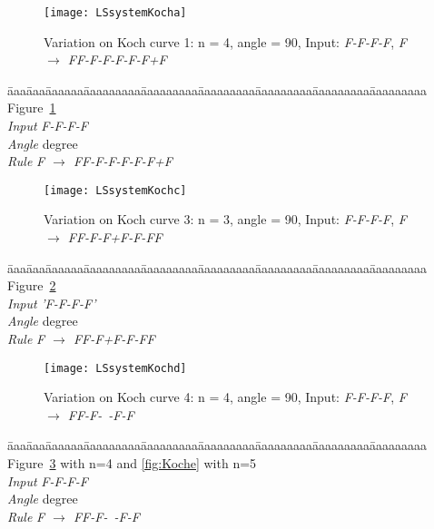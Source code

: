 \begin{figure}[!h]
\centerline{\texttt{[image: LSsystemKocha]}}
\caption{Variation on Koch curve 1: n = 4, angle = 90, Input: \emph{F-F-F-F}, \emph{F $\rightarrow$ FF-F-F-F-F-F+F}}
\label{fig:Kocha}
\end{figure}


\begin{tabbing}
\=aaa\=aaa\=aaaaaa\=aaaaaaaaa\=aaaaaaaaa\=aaaaaaaaa\=aaaaaaaaa\=aaaaaaaaa\=aaaaaaaaa\kill
Figure~\ref{fig:Kocha} \\
\>\> \emph{Input} \>\>\emph{F-F-F-F}\\
\>\> \emph{Angle} \> degree\\
\>\> \emph{Rule}  \>\>\emph{F $\rightarrow$ FF-F-F-F-F-F+F}
\end{tabbing}






\begin{figure}[!htbp]
\centerline{\texttt{[image: LSsystemKochc]}}
\caption{Variation on Koch curve 3: n = 3, angle = 90, Input: \emph{F-F-F-F}, \emph{F $\rightarrow$ FF-F-F+F-F-FF}}
\label{fig:Kochc}
\end{figure}

\begin{tabbing}
\=aaa\=aaa\=aaaaaa\=aaaaaaaaa\=aaaaaaaaa\=aaaaaaaaa\=aaaaaaaaa\=aaaaaaaaa\=aaaaaaaaa\kill
Figure~\ref{fig:Kochc} \\
\>\> \emph{Input} \>\>\emph{'F-F-F-F'}\\
\>\> \emph{Angle} \> degree\\
\>\> \emph{Rule}  \>\>\emph{F $\rightarrow$ FF-F+F-F-FF}
\end{tabbing}


\begin{figure}[!htbp]
\centerline{\texttt{[image: LSsystemKochd]}}
\caption{Variation on Koch curve 4: n = 4, angle = 90, Input: \emph{F-F-F-F}, \emph{F $\rightarrow$ FF-F-\ -F-F}}
\label{fig:Kochd}
\end{figure}


\begin{tabbing}
\=aaa\=aaa\=aaaaaa\=aaaaaaaaa\=aaaaaaaaa\=aaaaaaaaa\=aaaaaaaaa\=aaaaaaaaa\=aaaaaaaaa\kill
Figure~\ref{fig:Kochd} with n=4 and \ref{fig:Koche} with n=5\\
\>\> \emph{Input} \>\>\emph{F-F-F-F}\\
\>\> \emph{Angle} \> degree\\
\>\> \emph{Rule}  \>\>\emph{F $\rightarrow$ FF-F-\ -F-F}
\end{tabbing}

